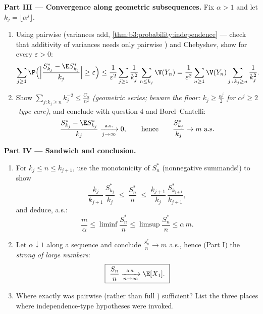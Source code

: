 \begin{problem}
\medskip
\noindent\textbf{Part III --- Convergence along geometric
subsequences.} Fix $\alpha > 1$ and let $k_j =
\lfloor\alpha^j\rfloor$.
\begin{enumerate}[resume]
  \item Using pairwise  (variances add,
        \cref{thm:b3:probability:independence} --- check that
        additivity of variances needs only pairwise
        ) and Chebyshev, show for every
        $\varepsilon > 0$:
        \[
        \sum_{j\geq1}\P\Bigl(\Bigl|
        \frac{S^*_{k_j} - \E S^*_{k_j}}{k_j}\Bigr| \geq
        \varepsilon\Bigr)
        \leq
        \frac1{\varepsilon^2}\sum_{j\geq1}\frac1{k_j^2}
        \sum_{n\leq k_j}\V(Y_n)
        = \frac1{\varepsilon^2}\sum_{n\geq1}\V(Y_n)
        \sum_{j\,:\,k_j\geq n}\frac1{k_j^2} .
        \]
  \item Show $\sum_{j : k_j \geq n}k_j^{-2} \leq
        \frac{C_\alpha}{n^2}$ \emph{(geometric series;
        beware the floor: $k_j \geq \frac{\alpha^j}2$ for
        $\alpha^j \geq 2$-type care)}, and conclude with
        question 4 and Borel--Cantelli:
        \[
        \frac{S^*_{k_j} - \E S^*_{k_j}}{k_j}
        \xrightarrow[j\to\infty]{\text{a.s.}} 0,
        \qquad\text{hence}\qquad
        \frac{S^*_{k_j}}{k_j} \to m \ \text{a.s.}
        \]
\end{enumerate}

\medskip
\noindent\textbf{Part IV --- Sandwich and conclusion.}
\begin{enumerate}[resume]
  \item For $k_j \leq n \leq k_{j+1}$, use the monotonicity
        of $S^*_n$ (nonnegative summands!) to show
        \[
        \frac{k_j}{k_{j+1}}\,\frac{S^*_{k_j}}{k_j}
        \;\leq\; \frac{S^*_n}{n} \;\leq\;
        \frac{k_{j+1}}{k_j}\,\frac{S^*_{k_{j+1}}}{k_{j+1}},
        \]
        and deduce, a.s.:
        \[
        \frac m\alpha \leq \liminf\frac{S^*_n}n \leq
        \limsup\frac{S^*_n}n \leq \alpha\,m .
        \]
  \item Let $\alpha \downarrow 1$ along a sequence and
        conclude $\frac{S_n^*}n \to m$ a.s., hence (Part I)
        the \emph{strong  of large numbers}:
        \[
        \boxed{\ \frac{S_n}{n}
        \xrightarrow[n\to\infty]{\text{a.s.}} \E[X_1].\ }
        \]
  \item Where exactly was pairwise  (rather than
        full ) sufficient? List the three places
        where independence-type hypotheses were invoked.
\end{enumerate}


\end{problem}
